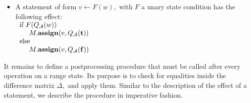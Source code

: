 \begin{itemize}
\[\begin{array}{l}
            \hspace*{0.8cm} \mbox{require} \ \Delta. {\bf isconsistent}( )) \\
            \hspace*{0.8cm} M. {\bf assign}(v, Q_{\cal A}( {\bf t} )) \\
            \hspace*{0.5cm} \bullet \ \Delta. {\bf assign}( w_1, w_2,
               \Delta. {\bf at}( w_1, w_2 ) \cap \{ 0,1,2^{*} \} \, ); \ 
            {\bf close}( \Delta ) \\
            \hspace*{0.8cm} \mbox{require} \ \Delta. {\bf isconsistent}( )) \\
            \hspace*{0.8cm} M. {\bf assign}( v, Q_{\cal A}( {\bf f} )) \\
         \end{array}
      \]
      The other comparison operators are analogeous.
      Executing the code above results in either one or two successor states,
      dependent on whether assuming $ w_1 < w_2 $ or $ w_1 \geq w_2 $ is consistent
      with $ \Delta. $
\item
   A statement of form $ v \leftarrow F(w), $ with
   $ F $ a unary state condition has the following effect: \\
   \hspace*{1.0cm}
   $ \begin{array}{l}
         \mbox{if } F( Q_{\cal A}(w)) \\
         \hspace*{0.5cm} M. {\bf assign}(v, Q_{\cal A}({\bf t})) \\
         \mbox{else} \\
         \hspace*{0.5cm} M. {\bf assign}(v, Q_{\cal A}({\bf f})) \\
      \end{array}
   $ 
\end{itemize}
It remains to define a postprocessing procedure that must be called
after every operation on a range state.
Its purpose is to check for equalities inside the
difference matrix $ \Delta, $ and apply them. 
Similar to the description of the effect of a statement, we
describe the procedure in imperative fashion. 
